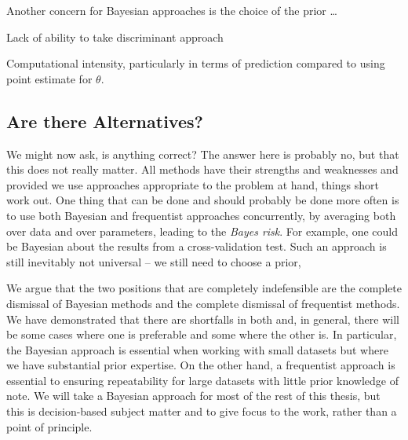 Another concern for Bayesian approaches is the choice of the prior \dots {}

Lack of ability to take discriminant approach

Computational intensity, particularly in terms of prediction compared to using point estimate for $\theta$.

\subsection{Are there Alternatives?}
\label{sec:bayes:religion:correct}


We might now ask, is anything correct?  The answer here is probably no, but that this does not really matter.  All methods
have their strengths and weaknesses and provided we use approaches appropriate to the problem at hand, things short work out.
One thing that can be done and should probably be done more often is to use both Bayesian and frequentist approaches concurrently,
by averaging both over data and over parameters, leading to the \emph{Bayes risk}.   For example, one could be Bayesian 
about the results from a cross-validation test.  Such an approach is still inevitably not universal -- we still need to choose
a prior, 

We argue that the two positions that are completely indefensible are the complete dismissal of Bayesian
methods and the complete dismissal of frequentist methods.  We have demonstrated that there are shortfalls
in both and, in general, there will be some cases where one is preferable and some where the other is.  In
particular, the Bayesian approach is essential when working with small datasets but where we have substantial
prior expertise.  On the other hand, a frequentist approach is essential to ensuring repeatability for large
datasets with little prior knowledge of note.  
We will take a Bayesian approach for most of the rest of this thesis, but this is decision-based subject matter and
to give focus to the work, rather than a point of principle.

